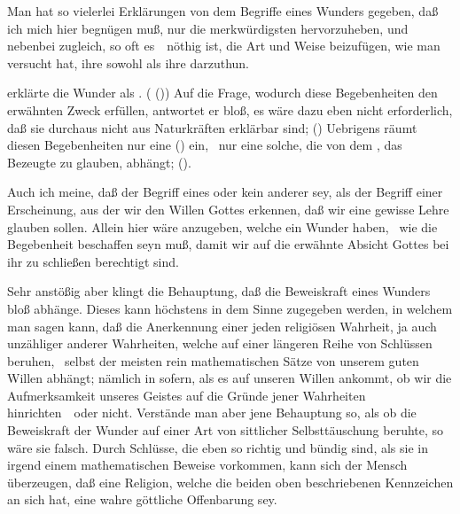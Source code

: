Man hat so vielerlei Erklärungen von dem Begriffe eines Wunders gegeben, daß ich mich hier begnügen muß, nur die merkwürdigsten hervorzuheben, und nebenbei zugleich, so oft es~\ nöthig ist, die Art und Weise beizufügen, wie man versucht hat, ihre  sowohl als ihre  darzuthun.
\begin{aufza}
\item {} erklärte die Wunder als . ( ()) Auf die Frage, wodurch diese Begebenheiten den erwähnten Zweck erfüllen, antwortet er bloß, es wäre dazu eben nicht erforderlich, daß sie durchaus nicht aus Naturkräften erklärbar sind;  () Uebrigens räumt  diesen Begebenheiten nur eine  () ein, \dh\ nur eine solche, die von dem , das Bezeugte zu glauben, abhängt; ().
\end{aufza}\par
Auch ich meine, daß der Begriff eines  oder  kein anderer sey, als der Begriff einer Erscheinung, aus der wir den Willen Gottes erkennen, daß wir eine gewisse Lehre glauben sollen. Allein hier wäre anzugeben, welche  ein Wunder haben, \dh\ wie die Begebenheit beschaffen seyn muß, damit wir auf die erwähnte Absicht Gottes bei ihr zu schließen berechtigt sind.\par
   Sehr anstößig aber klingt die Behauptung, daß die Beweiskraft eines Wunders bloß  abhänge. Dieses kann höchstens in dem Sinne zugegeben werden, in welchem man sagen kann, daß die Anerkennung einer jeden religiösen Wahrheit, ja auch unzähliger anderer Wahrheiten, welche auf einer längeren Reihe von Schlüssen beruhen, \zB\ selbst der meisten rein mathematischen Sätze von unserem guten Willen abhängt; nämlich in sofern, als es auf unseren Willen ankommt, ob wir die Aufmerksamkeit unseres Geistes auf die Gründe jener Wahrheiten hinrichten~\ oder nicht. Verstände man aber jene Behauptung so, als ob die Beweiskraft der Wunder auf einer Art von sittlicher Selbsttäuschung beruhte, so wäre sie falsch. Durch Schlüsse, die eben so richtig und bündig sind, als sie in irgend einem mathematischen Beweise vorkommen, kann sich der Mensch überzeugen, daß eine Religion, welche die beiden oben beschriebenen Kennzeichen an sich hat, eine wahre göttliche Offenbarung sey.
